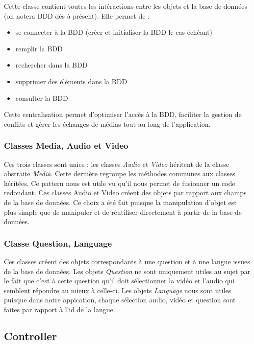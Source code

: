 Cette classe contient toutes les intéractions entre les objets et la base de données (on notera BDD dès à présent). Elle permet de :

\begin{itemize}
 \item se connecter à la BDD (créer et initialiser la BDD le cas échéant)
 \item remplir la BDD
 \item rechercher dans la BDD
 \item supprimer des éléments dans la BDD
 \item consulter la BDD
\end{itemize}

Cette centralisation permet d'optimiser l'accès à la BDD, faciliter la gestion de conflits et gérer les échanges de médias tout au long de l'application.

\subsubsection{Classes Media, Audio et Video}

Ces trois classes sont unies : les classes \textit{Audio} et \textit{Video} héritent de la classe abstraite \textit{Media}. Cette dernière regroupe les méthodes communes aux classes héritées. Ce pattern nous est utile vu qu'il nous permet de fusionner un code redondant. Ces classes Audio et Video créent des objets par rapport aux champs de la base de données. Ce choix a été fait puisque la manipulation d'objet est plus simple que de manipuler et de réutiliser directement à partir de la base de données.

\subsubsection{Classe Question, Language}

Ces classes créent des objets correspondants à une question et à une langue issues de la base de données.
Les objets \textit{Question} ne sont uniquement utiles au sujet par le fait que c'est à cette question qu'il doit sélectionner la vidéo et l'audio qui semblent répondre au mieux à celle-ci.
Les objets \textit{Language} nous sont utiles puisque dans notre appication, chaque sélection audio, vidéo et question sont faites par rapport à l'id de la langue.

\subsection{Controller}

